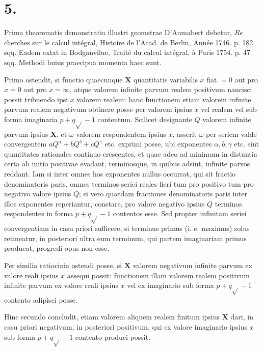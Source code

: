 \documentclass[10pt]{article}
\begin{document}
\section*{5.}
Prima theorematis demonstratio illustri geometrae D'Aumabert debetur, \(R e\) cherches sur le calcul intégral, Histoire de l'Acad. de Berlin, Année 1746. p. 182 sqq. Eadem extat in Bodganvilue, Traité du calcul intégral, à Paris 1754. p. 47 sqq. Methodi huius praecipua momenta haec sunt.

Primo ostendit, si functio quaecunque \(\boldsymbol{X}\) quantitatis variabilis \(x\) fiat \(=0\) aut pro \(x=0\) aut pro \(x=\infty\), atque valorem infinite parvum realem positivum nancisci possit tribuendo ipsi \(x\) valorem realem: hanc functionem etiam valorem infinite parvum realem negativum obtinere posse per valorem ipsius \(x\) vel realem vel sub forma imaginaria \(p+q \sqrt{ }-1\) contentum. Scilicet designante \(Q\) valorem infinite parvum ipsius \(\boldsymbol{X}\), et \(\omega\) valorem respondentem ipsius \(x\), asserit \(\omega\) per seriem valde convergentem \(a Q^{\alpha}+b Q^{b}+c Q^{\gamma}\) etc. exprimi posse, ubi exponentes \(\alpha, b, \gamma\) etc. sint quantitates rationales continuo crescentes, et quae adeo ad minimum in distantia certa ab initio positivae evadant, terminosque, in quibus adsint, infinite parvos reddant. Iam si inter omnes hos exponentes nullus occurrat, qui sit fractio denominatoris paris, omnes terminos seriei reales fieri tum pro positivo tum pro negativo valore ipsius \(Q\); si vero quaedam fractiones denominatoris paris inter illos exponentes reperiantur, constare, pro valore negativo ipsius \(Q\) terminos respondentes in forma \(p+q \sqrt{ }-1\) contentos esse. Sed propter infinitam seriei convergentiam in casu priori sufficere, si terminus primus (i. e. maximus) solus retineatur, in posteriori ultra eum terminum, qui partem imaginariam primus producat, progredi opus non esse.

Per similia ratiocinia ostendi posse, si \(\boldsymbol{X}\) valorem negativum infinite parvum ex valore reali ipsius \(x\) assequi possit: functionem illam valorem realem positivum infinite parvum ex valore reali ipsius \(x\) vel ex imaginario sub forma \(p+q \sqrt{ }-1\) contento adipisci posse.

Hinc secundo concludit, etiam valorem aliquem realem finitum ipsius \(\boldsymbol{X}\) dari, in casu priori negativum, in posteriori positivum, qui ex valore imaginario ipsius \(x\) sub forma \(p+q \sqrt{ }-1\) contento produci possit.
\end{document}

